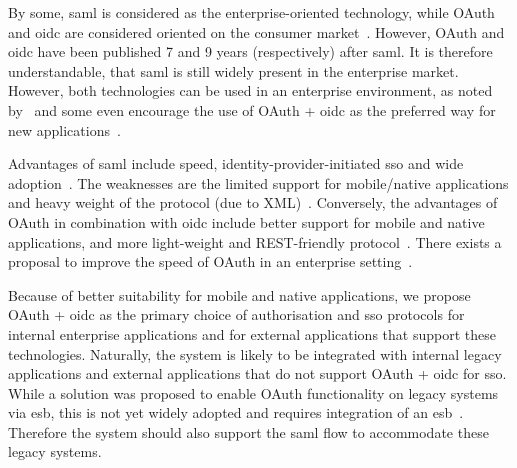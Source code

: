 By some, \acrshort{saml} is considered as the enterprise-oriented technology, while OAuth and \acrshort{oidc} are considered oriented on the consumer market~\cite{Fagbemi2016ComparingWS-Federation, SoftwareSecured2016Differentiating2, OneLoginInc.SAMLOAuth}. However, OAuth and \acrshort{oidc} have been published 7 and 9 years  (respectively) after \acrshort{saml}. It is therefore understandable, that \acrshort{saml} is still widely present in the enterprise market. However, both technologies can be used in an enterprise environment, as noted by~\cite{Naik2017SecuringConnect} and some even encourage the use of OAuth + \acrshort{oidc} as the preferred way for new applications~\cite{barbkess2019SingleDirectory}.

Advantages of \acrshort{saml} include speed, identity-provider-initiated \acrshort{sso} and wide adoption~\cite{OneLoginInc.SAMLOAuth, Naik2017SecuringConnect}. The weaknesses are the limited support for mobile/native applications and heavy weight of the protocol (due to XML)~\cite{Naik2017SecuringConnect}. Conversely, the advantages of OAuth in combination with \acrshort{oidc} include better support for mobile and native applications, and more light-weight and REST-friendly protocol~\cite{Naik2017SecuringConnect}. There exists a proposal to improve the speed of OAuth in an enterprise setting~\cite{Noureddine2011AEnterprise}.

Because of better suitability for mobile and native applications, we propose OAuth + \acrshort{oidc} as the primary choice of authorisation and \acrshort{sso} protocols for internal enterprise applications and for external applications that support these technologies. Naturally, the system is likely to be integrated with internal legacy applications and external applications that do not support OAuth + \acrshort{oidc} for \acrshort{sso}. While a solution was proposed to enable OAuth functionality on legacy systems via \acrfull{esb}, this is not yet widely adopted and requires integration of an \acrshort{esb}~\cite{deSousaRibeiro2018AnBus}. Therefore the system should also support the \acrshort{saml} flow to accommodate these legacy systems.




